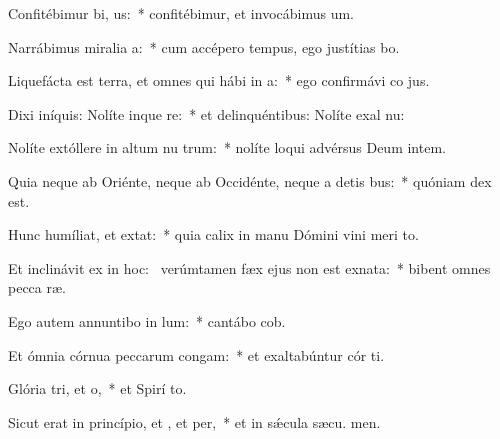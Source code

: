 \item Confitébimur bi, us:~* confitébimur, et invocábimus  um.
\item Narrábimus miralia a:~* cum accépero tempus, ego justítias bo.
\item Liquefácta est terra, et omnes qui hábi in a:~* ego confirmávi co jus.
\item Dixi iníquis: Nolíte inque re:~* et delinquéntibus: Nolíte exal nu:
\item Nolíte extóllere in altum nu trum:~* nolíte loqui advérsus Deum intem.
\item Quia neque ab Oriénte, neque ab Occidénte, neque a detis bus:~* quóniam  dex est.
\item Hunc humíliat, et  extat:~* quia calix in manu Dómini vini meri  to.
\item Et inclinávit ex  in hoc:~\pscross{} verúmtamen fæx ejus non est exnata:~* bibent omnes pecca ræ.
\item Ego autem annuntibo in lum:~* cantábo  cob.
\item Et ómnia córnua peccarum congam:~* et exaltabúntur cór ti.
\item Glória tri, et o,~* et Spirí to.
\item Sicut erat in princípio, et , et per,~* et in sǽcula sæcu. men.

